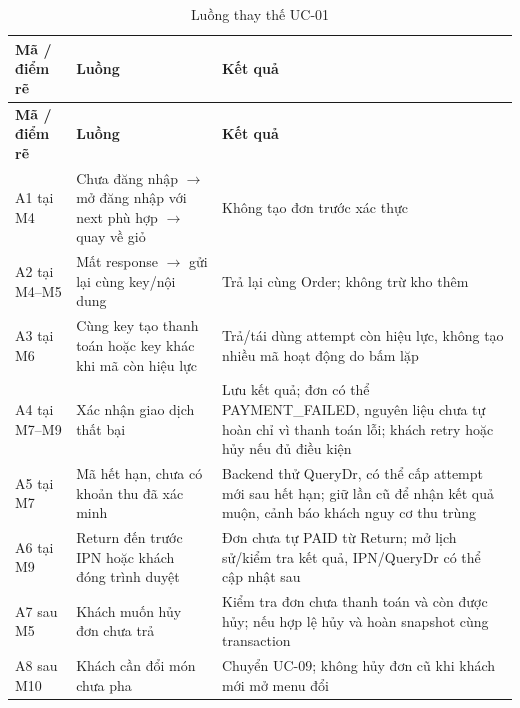 \begin{longtable}{|>{\raggedright\arraybackslash}p{}|>{\raggedright\arraybackslash}p{}|>{\raggedright\arraybackslash}p{}|}
\caption{Luồng thay thế UC-01}\\\hline
\textbf{Mã / điểm rẽ} & \textbf{Luồng} & \textbf{Kết quả} \\ \hline
\endfirsthead
\hline
\textbf{Mã / điểm rẽ} & \textbf{Luồng} & \textbf{Kết quả} \\ \hline
\endhead
A1 tại M4 & Chưa đăng nhập \(\rightarrow\) mở đăng nhập với next phù hợp \(\rightarrow\) quay về giỏ & Không tạo đơn trước xác thực \\ \hline
A2 tại M4--M5 & Mất response \(\rightarrow\) gửi lại cùng key/nội dung & Trả lại cùng Order; không trừ kho thêm \\ \hline
A3 tại M6 & Cùng key tạo thanh toán hoặc key khác khi mã còn hiệu lực & Trả/tái dùng attempt còn hiệu lực, không tạo nhiều mã hoạt động do bấm lặp \\ \hline
A4 tại M7--M9 & Xác nhận giao dịch thất bại & Lưu kết quả; đơn có thể PAYMENT\_FAILED, nguyên liệu chưa tự hoàn chỉ vì thanh toán lỗi; khách retry hoặc hủy nếu đủ điều kiện \\ \hline
A5 tại M7 & Mã hết hạn, chưa có khoản thu đã xác minh & Backend thử QueryDr, có thể cấp attempt mới sau hết hạn; giữ lần cũ để nhận kết quả muộn, cảnh báo khách nguy cơ thu trùng \\ \hline
A6 tại M9 & Return đến trước IPN hoặc khách đóng trình duyệt & Đơn chưa tự PAID từ Return; mở lịch sử/kiểm tra kết quả, IPN/QueryDr có thể cập nhật sau \\ \hline
A7 sau M5 & Khách muốn hủy đơn chưa trả & Kiểm tra đơn chưa thanh toán và còn được hủy; nếu hợp lệ hủy và hoàn snapshot cùng transaction \\ \hline
A8 sau M10 & Khách cần đổi món chưa pha & Chuyển UC-09; không hủy đơn cũ khi khách mới mở menu đổi \\ \hline
\end{longtable}
\endgroup
\begingroup\footnotesize\setlength{\tabcolsep}{3pt}
